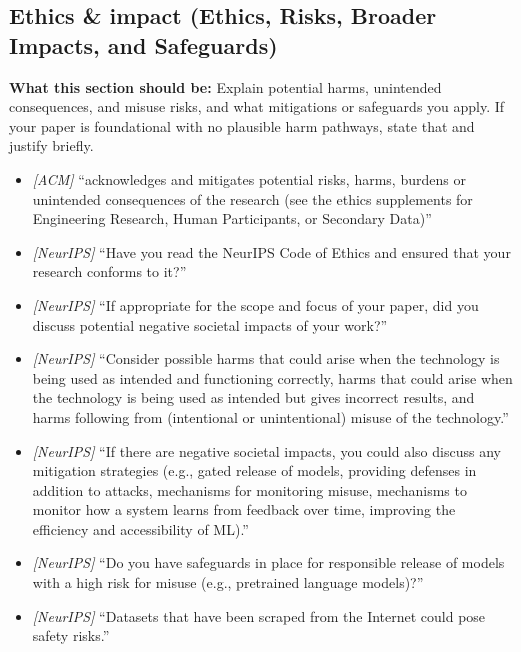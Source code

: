 \documentclass[11pt]{article}
\begin{document}
\subsection{Ethics & impact (Ethics, Risks, Broader Impacts, and Safeguards)}
\noindent\textbf{What this section should be:}
Explain potential harms, unintended consequences, and misuse risks, and what mitigations or safeguards you apply. If your paper is foundational with no plausible harm pathways, state that and justify briefly.
\begin{itemize}
  \item \textit{[ACM]} ``acknowledges and mitigates potential risks, harms, burdens or unintended consequences of the research (see the ethics supplements for Engineering Research, Human Participants, or Secondary Data)''
  \item \textit{[NeurIPS]} ``Have you read the NeurIPS Code of Ethics and ensured that your research conforms to it?''
  \item \textit{[NeurIPS]} ``If appropriate for the scope and focus of your paper, did you discuss potential negative societal impacts of your work?''
  \item \textit{[NeurIPS]} ``Consider possible harms that could arise when the technology is being used as intended and functioning correctly, harms that could arise when the technology is being used as intended but gives incorrect results, and harms following from (intentional or unintentional) misuse of the technology.''
  \item \textit{[NeurIPS]} ``If there are negative societal impacts, you could also discuss any mitigation strategies (e.g., gated release of models, providing defenses in addition to attacks, mechanisms for monitoring misuse, mechanisms to monitor how a system learns from feedback over time, improving the efficiency and accessibility of ML).''
  \item \textit{[NeurIPS]} ``Do you have safeguards in place for responsible release of models with a high risk for misuse (e.g., pretrained language models)?''
  \item \textit{[NeurIPS]} ``Datasets that have been scraped from the Internet could pose safety risks.''
\end{itemize}
\end{document}
